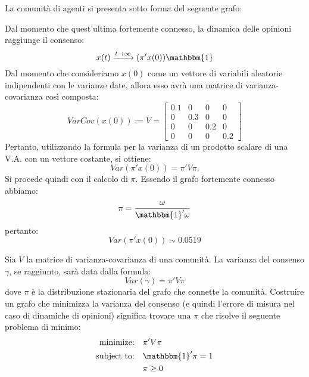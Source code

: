 
\begin{alphaparts}
    \questionpart %
    La comunità di agenti si presenta sotto forma del seguente grafo:
    
    Dal momento che quest'ultima fortemente connesso, la dinamica delle opinioni raggiunge il consenso:
    \[x(t) \xrightarrow[]{t\to \infty}(\pi'x(0))\mathbbm{1}\]
    Dal momento che consideriamo \(x(0)\) come un vettore di variabili aleatorie indipendenti con le varianze date, allora esso avrà una matrice di varianza-covarianza così composta:
    \[VarCov(x(0)):= V= \begin{bmatrix}
        0.1 & 0 & 0 & 0 \\
        0 & 0.3 & 0 & 0\\
        0 & 0 & 0.2 & 0\\
        0 & 0 & 0 & 0.2
    \end{bmatrix}\]
    Pertanto, utilizzando la formula per la varianza di un prodotto scalare di una V.A. con un vettore costante, si ottiene:
    \[Var(\pi'x(0)) = \pi' V \pi.\]
    Si procede quindi con il calcolo di \(\pi\). Essendo il grafo fortemente connesso abbiamo:
    \[\pi = \frac{\omega}{\mathbbm{1}'\omega}\]
    pertanto:
    \[Var(\pi'x(0)) \sim 0.0519\]

    \questionpart %
    Sia \(V\) la matrice di varianza-covarianza di una comunità. La varianza del consenso \(\gamma\), se raggiunto, sarà data dalla formula:
    \[Var(\gamma) = \pi' V \pi\]
    dove \(\pi\) è la distribuzione stazionaria del grafo che connette la comunità. Costruire un grafo che minimizza la varianza del consenso (e quindi l'errore di misura nel caso di dinamiche di opinioni) significa trovare una \(\pi\) che risolve il seguente problema di minimo:
    \begin{align*}
        \text{minimize:} \quad & \pi'V\pi \\
        \text{subject to:} \quad &\mathbbm{1}'\pi = 1 \\
        & \pi \geq  0
    \end{align*}


\end{alphaparts}
